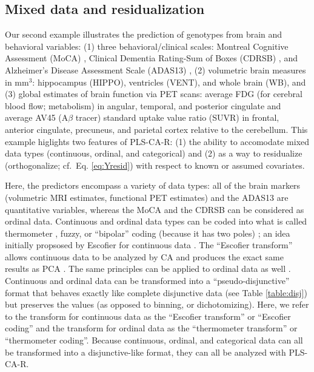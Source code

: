 \documentclass[12pt]{article}
\begin{document}
\hypertarget{mixed-data-and-residualization}{%
\subsection{Mixed data and
residualization}\label{mixed-data-and-residualization}}

\label{section:mixed}

Our second example illustrates the prediction of genotypes from brain
and behavioral variables: (1) three behavioral/clinical scales: Montreal
Cognitive Assessment (MoCA) \citep{nasreddine_montreal_2005}, Clinical
Dementia Rating-Sum of Boxes (CDRSB) \citep{morris1993clinical}, and
Alzheimer's Disease Assessment Scale (ADAS13)
\citep{skinner_alzheimers_2012}, (2) volumetric brain measures in
\(\textrm{mm}^3\): hippocampus (HIPPO), ventricles (VENT), and whole
brain (WB), and (3) global estimates of brain function via PET scans:
average FDG (for cerebral blood flow; metabolism) in angular, temporal,
and posterior cingulate and average AV45 (A\(\beta\) tracer) standard
uptake value ratio (SUVR) in frontal, anterior cingulate, precuneus, and
parietal cortex relative to the cerebellum. This example higlights two
features of PLS-CA-R: (1) the ability to accomodate mixed data types
(continuous, ordinal, and categorical) and (2) as a way to residualize
(orthogonalize; cf.~Eq. \ref{eq:Yresid}) with respect to known or
assumed covariates.

Here, the predictors encompass a variety of data types: all of the brain
markers (volumetric MRI estimates, functional PET estimates) and the
ADAS13 are quantitative variables, whereas the MoCA and the CDRSB can be
considered as ordinal data. Continuous and ordinal data types can be
coded into what is called thermometer \citep{beaton2018generalization},
fuzzy, or ``bipolar'' coding (because it has two poles)
\citep{greenacrefuzzy}; an idea initially propsosed by Escofier for
continuous data \citep{escofier_traitement_1979}. The ``Escofier
transform'' allows continuous data to be analyzed by CA and produces the
exact same results as PCA \citep{escofier_traitement_1979}. The same
principles can be applied to ordinal data as well
\citep{beaton2018generalization}. Continuous and ordinal data can be
transformed into a ``pseudo-disjunctive'' format that behaves exactly
like complete disjunctive data (see Table \ref{table:disj}) but
preserves the values (as opposed to binning, or dichotomizing). Here, we
refer to the transform for continuous data as the ``Escofier transform''
or ``Escofier coding'' \citep{beaton_partial_2016} and the transform for
ordinal data as the ``thermometer transform'' or ``thermometer coding''.
Because continuous, ordinal, and categorical data can all be transformed
into a disjunctive-like format, they can all be analyzed with PLS-CA-R.
\end{document}
